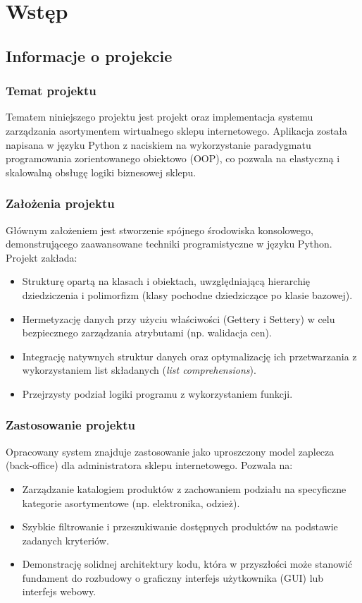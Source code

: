 \chapter{Wstęp}

\section{Informacje o projekcie}

\subsection*{Temat projektu}
Tematem niniejszego projektu jest projekt oraz implementacja systemu zarządzania asortymentem wirtualnego sklepu internetowego. Aplikacja została napisana w języku Python z naciskiem na wykorzystanie paradygmatu programowania zorientowanego obiektowo (OOP), co pozwala na elastyczną i skalowalną obsługę logiki biznesowej sklepu.

\subsection*{Założenia projektu}
Głównym założeniem jest stworzenie spójnego środowiska konsolowego, demonstrującego zaawansowane techniki programistyczne w języku Python. Projekt zakłada:
\begin{itemize}
    \item Strukturę opartą na klasach i obiektach, uwzględniającą hierarchię dziedziczenia i polimorfizm (klasy pochodne dziedziczące po klasie bazowej).
    \item Hermetyzację danych przy użyciu właściwości (Gettery i Settery) w celu bezpiecznego zarządzania atrybutami (np. walidacja cen).
    \item Integrację natywnych struktur danych oraz optymalizację ich przetwarzania z wykorzystaniem list składanych (\textit{list comprehensions}).
    \item Przejrzysty podział logiki programu z wykorzystaniem funkcji.
\end{itemize}

\subsection*{Zastosowanie projektu}
Opracowany system znajduje zastosowanie jako uproszczony model zaplecza (back-office) dla administratora sklepu internetowego. Pozwala na:
\begin{itemize}
    \item Zarządzanie katalogiem produktów z zachowaniem podziału na specyficzne kategorie asortymentowe (np. elektronika, odzież).
    \item Szybkie filtrowanie i przeszukiwanie dostępnych produktów na podstawie zadanych kryteriów.
    \item Demonstrację solidnej architektury kodu, która w przyszłości może stanowić fundament do rozbudowy o graficzny interfejs użytkownika (GUI) lub interfejs webowy.
\end{itemize}

